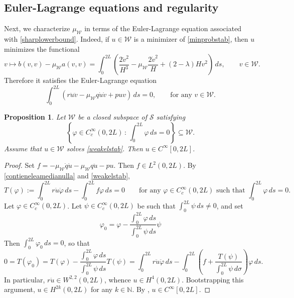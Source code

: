\documentclass[11pt]{amsart}
\newtheorem{proposition}[theorem]{Proposition}
\theoremstyle{definition}
\theoremstyle{remark}
\numberwithin{equation}{section}
\begin{document}
\subsection{Euler-Lagrange equations and regularity}\label{sec_elforstab}
Next, we characterize $\mu_\mathcal W$ in terms of the Euler-Lagrange equation associated with \eqref{sharplowerbound}.
Indeed, if $u\in\mathcal W$ is a minimizer of \eqref{minprobstab}, then $u$ minimizes the functional
\begin{equation*}
v\mapsto b(v,v)-\mu_{\mathcal W} a(v,v)= \int_0^{2L}\left(\frac{2\ddot v^2}{H^3}-\mu_{\mathcal W}\frac{2\dot v^2}{H}+(2-\lambda)H v^2\right)\,ds,\qquad v\in\mathcal W.
\end{equation*}
Therefore it satisfies the Euler-Lagrange equation
\begin{equation}\label{weakelstab}
\int_0^{2L}\left(r \ddot u\ddot v-\mu_{\mathcal W} q\dot u\dot v+pu v\right)\,ds=0,\qquad \text{for any }v\in \mathcal W.
\end{equation}
\begin{proposition}
Let $\mathcal W$ be a closed subspace of $\mathcal S$ satisfying 
\begin{equation}\label{contieneleamedianulla}
	\left\{\varphi\in C^\infty_c(0,2L)\,:\,\int_0^{2L}\varphi\,ds=0\right\}\subseteq\mathcal W.
\end{equation}
Assume that $u\in\mathcal W$ solves \eqref{weakelstab}. Then $u\in C^\infty[0,2L]$.
\end{proposition}
\begin{proof}
Set $f=-\mu_{\mathcal W}\dot q\dot u-\mu_{\mathcal W} q\ddot u-p u$. Then $f\in L^2(0,2L)$. By \eqref{contieneleamedianulla} and \eqref{weakelstab},
\begin{equation*}
	T(\varphi):=   \int_0^{2L}r\ddot u\ddot \varphi\,ds-\int_0^{2L}f\varphi\,ds=0\qquad\text{for any }\varphi\in C^\infty_c(0,2L)\text{ such that }\int_0^{2L}\varphi\,ds=0.
\end{equation*}
Let $\varphi\in C^\infty_c(0,2L)$. Let $\psi\in C^\infty_c(0,2L)$ be such that $\int_0^{2L}\psi\,ds\neq 0$, and set $$\varphi_0=\varphi-\frac{\int_0^{2L}\varphi\,ds}{\int_0^{2L}\psi\,ds}\psi$$
Then $\int_0^{2L}\varphi_0\,ds=0$, so that 
\begin{equation*}
	0=T(\varphi_0)=T(\varphi)-\frac{\int_0^{2L}\varphi\,ds}{\int_0^{2L}\psi\,ds} T(\psi)=\int_0^{2L}r\ddot u\ddot \varphi\,ds-\int_0^{2L}\left(f+\frac{T(\psi)}{\int_0^{2L}\psi\,d\sigma}\right)\varphi\,ds.
\end{equation*}
In particular, $r\ddot u\in W^{2,2}(0,2L)$, whence $u\in H^4(0,2L)$. Bootstrapping this argument, $u\in H^{2k}(0,2L)$ for any $k\in\mathbb N$. By \cite[Theorem 8.8]{MR2759829}, $u\in C^\infty[0,2L]$.
\end{proof}
\end{document}
